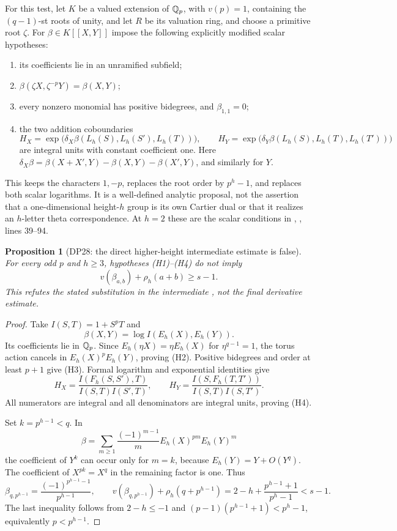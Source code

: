 \documentclass[11pt,a4paper]{article}
\newtheorem{proposition}[theorem]{Proposition}
\theoremstyle{definition}\newtheorem{remark}[theorem]{Remark}
\begin{document}
For this test, let $K$ be a valued extension of $\mathbb Q_p$, with $v(p)=1$, containing the $(q-1)$-st roots of unity, and let $R$ be its valuation ring, and choose a primitive root $\zeta$. For $\beta\in K[[X,Y]]$ impose the following explicitly modified scalar hypotheses:
\begin{enumerate}[label=(H\arabic*),leftmargin=2.8em]
\item its coefficients lie in an unramified subfield;
\item $\beta(\zeta X,\zeta^{-p}Y)=\beta(X,Y)$;
\item every nonzero monomial has positive bidegrees, and $\beta_{1,1}=0$;
\item the two addition coboundaries
\[
 H_X=\exp\bigl(\delta_X\beta(L_h(S),L_h(S'),L_h(T))\bigr),\qquad
 H_Y=\exp\bigl(\delta_Y\beta(L_h(S),L_h(T),L_h(T'))\bigr)
\]
are integral units with constant coefficient one. Here $\delta_X\beta=\beta(X+X',Y)-\beta(X,Y)-\beta(X',Y)$, and similarly for $Y$.
\end{enumerate}
This keeps the characters $1,-p$, replaces the root order by $p^h-1$, and replaces both scalar logarithms. It is a well-defined analytic proposal, not the assertion that a one-dimensional height-$h$ group is its own Cartier dual or that it realizes an $h$-letter theta correspondence. At $h=2$ these are the scalar conditions in , , lines 39--94.

\begin{proposition}[DP28: the direct higher-height intermediate estimate is false]\label{DP28}
For every odd $p$ and $h\ge3$, hypotheses (H1)--(H4) do not imply
\[
 v(\beta_{a,b})+\rho_h(a+b)\ge s-1.
\]
This refutes the stated substitution in the intermediate , not the final derivative estimate.
\end{proposition}
\begin{proof}
Take $I(S,T)=1+S^pT$ and
\[
 \beta(X,Y)=\log I(E_h(X),E_h(Y)).
\]
Its coefficients lie in $\mathbb Q_p$. Since $E_h(\eta X)=\eta E_h(X)$ for $\eta^{q-1}=1$, the torus action cancels in $E_h(X)^pE_h(Y)$, proving (H2). Positive bidegrees and order at least $p+1$ give (H3). Formal logarithm and exponential identities give
\[
 H_X=\frac{I(F_h(S,S'),T)}{I(S,T)I(S',T)},\qquad
 H_Y=\frac{I(S,F_h(T,T'))}{I(S,T)I(S,T')}.
\]
All numerators are integral and all denominators are integral units, proving (H4).

Set $k=p^{h-1}<q$. In
\[
 \beta=\sum_{m\ge1}\frac{(-1)^{m-1}}m E_h(X)^{pm}E_h(Y)^m
\]
the coefficient of $Y^k$ can occur only for $m=k$, because $E_h(Y)=Y+O(Y^q)$. The coefficient of $X^{pk}=X^q$ in the remaining factor is one. Thus
\[
 \beta_{q,p^{h-1}}=\frac{(-1)^{p^{h-1}-1}}{p^{h-1}},\qquad
 v(\beta_{q,p^{h-1}})+\rho_h(q+p^{h-1})
 =2-h+\frac{p^{h-1}+1}{p^h-1}<s-1.
\]
The last inequality follows from $2-h\le-1$ and $(p-1)(p^{h-1}+1)<p^h-1$, equivalently $p<p^{h-1}$.
\end{proof}
\end{document}
